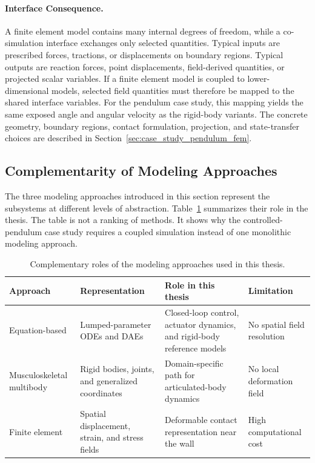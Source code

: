 \paragraph{Interface Consequence.}
A finite element model contains many internal degrees of freedom, while a co-simulation interface exchanges only selected quantities.
Typical inputs are prescribed forces, tractions, or displacements on boundary regions.
Typical outputs are reaction forces, point displacements, field-derived quantities, or projected scalar variables.
If a finite element model is coupled to lower-dimensional models, selected field quantities must therefore be mapped to the shared interface variables.
For the pendulum case study, this mapping yields the same exposed angle and angular velocity as the rigid-body variants.
The concrete geometry, boundary regions, contact formulation, projection, and state-transfer choices are described in Section~\ref{sec:case_study_pendulum_fem}.

\subsection{Complementarity of Modeling Approaches}
\label{sec:modeling_complementarity}

The three modeling approaches introduced in this section represent the subsystems at different levels of abstraction.
Table~\ref{tab:modeling_complementarity} summarizes their role in the thesis.
The table is not a ranking of methods.
It shows why the controlled-pendulum case study requires a coupled simulation instead of one monolithic modeling approach.

\begin{table}[htbp]
    \centering
    \small
    \caption[Roles of modeling approaches]{Complementary roles of the modeling approaches used in this thesis.}
    \label{tab:modeling_complementarity}
    \begin{tabular}{@{}p{3.0cm}p{3.5cm}p{4.0cm}p{3.2cm}@{}}
        \toprule
        \textbf{Approach}
            & \textbf{Representation}
            & \textbf{Role in this thesis}
            & \textbf{Limitation} \\
        \midrule
        Equation-based
            & Lumped-parameter \acp{ODE} and \acp{DAE}
            & Closed-loop control, actuator dynamics, and rigid-body reference models
            & No spatial field resolution \\
        \addlinespace
        Musculoskeletal multibody
            & Rigid bodies, joints, and generalized coordinates
            & Domain-specific path for articulated-body dynamics
            & No local deformation field \\
        \addlinespace
        Finite element
            & Spatial displacement, strain, and stress fields
            & Deformable contact representation near the wall
            & High computational cost \\
        \bottomrule
    \end{tabular}
\end{table}


